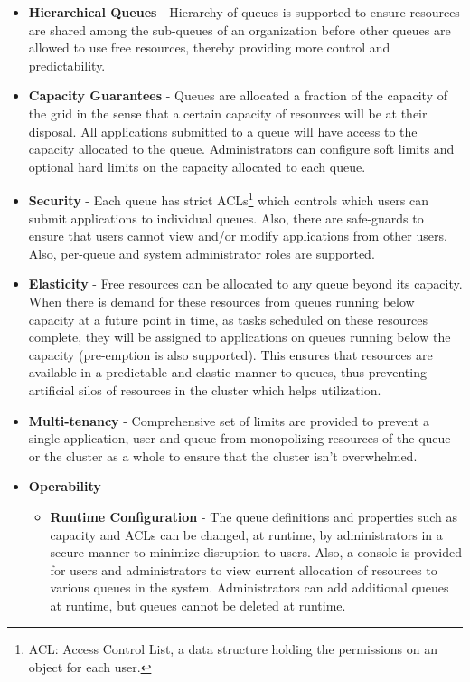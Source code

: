 \begin{itemize}

\item \textbf{Hierarchical Queues} - Hierarchy of queues is supported to ensure resources are shared among the sub-queues of an organization before other queues are allowed to use free resources, thereby providing more control and predictability.

\item \textbf{Capacity Guarantees} - Queues are allocated a fraction of the capacity of the grid in the sense that a certain capacity of resources will be at their disposal. All applications submitted to a queue will have access to the capacity allocated to the queue. Administrators can configure soft limits and optional hard limits on the capacity allocated to each queue.

\item \textbf{Security} - Each queue has strict ACLs\footnote{ACL: Access Control List, a data structure holding the permissions on an object for each user.} which controls which users can submit applications to individual queues. Also, there are safe-guards to ensure that users cannot view and/or modify applications from other users. Also, per-queue and system administrator roles are supported.

\item \textbf{Elasticity} - Free resources can be allocated to any queue beyond its capacity. When there is demand for these resources from queues running below capacity at a future point in time, as tasks scheduled on these resources complete, they will be assigned to applications on queues running below the capacity (pre-emption is also supported). This ensures that resources are available in a predictable and elastic manner to queues, thus preventing artificial silos of resources in the cluster which helps utilization.

\item \textbf{Multi-tenancy} - Comprehensive set of limits are provided to prevent a single application, user and queue from monopolizing resources of the queue or the cluster as a whole to ensure that the cluster isn't overwhelmed.

\item \textbf{Operability}
    \begin{itemize}
    \item \textbf{Runtime Configuration} - The queue definitions and properties such as capacity and ACLs can be changed, at runtime, by administrators in a secure manner to minimize disruption to users. Also, a console is provided for users and administrators to view current allocation of resources to various queues in the system. Administrators can add additional queues at runtime, but queues cannot be deleted at runtime.
    

\end{itemize}
\end{itemize}
